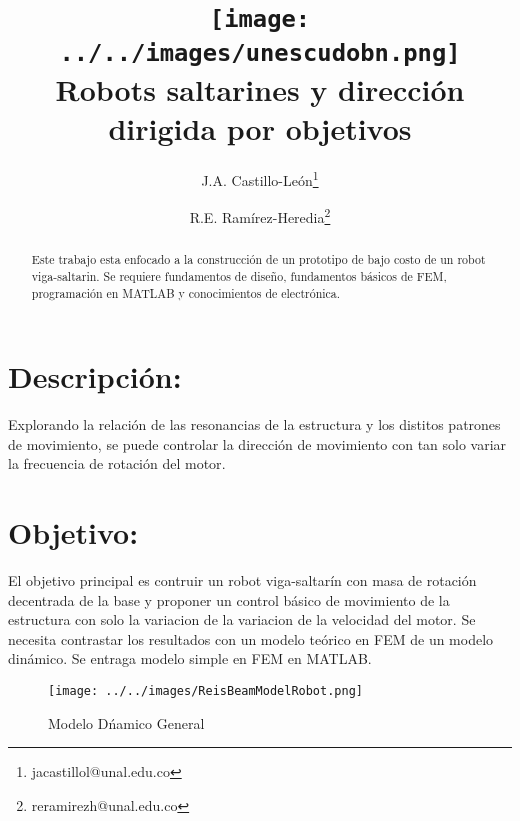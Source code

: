 \documentclass[10pt,onecolumn,twoside,letterpaper]{article}
\title{\vspace{-0.8cm}\texttt{[image: ../../images/unescudobn.png]}\\\vspace{-0.0cm}
  \LARGE \textbf{Robots saltarines y direcci\'on dirigida por objetivos}}
\author{J.A. Castillo-Le\'on\thanks{jacastillol@unal.edu.co} \and R.E. Ram\'irez-Heredia\thanks{reramirezh@unal.edu.co}}
\date{}
\begin{document}
\maketitle
\begin{abstract}\small
  Este trabajo esta enfocado a la construcci\'on de un prototipo de bajo costo de un robot viga-saltarin. Se requiere fundamentos de dise\~no, fundamentos b\'asicos de FEM, programaci\'on en MATLAB y conocimientos de electr\'onica.
\end{abstract}
\section{Descripci\'on:}
Explorando la relaci\'on de las resonancias de la estructura y los distitos patrones de movimiento, se puede controlar la direcci\'on de movimiento con tan solo variar la frecuencia de rotaci\'on del motor\cite{Reis2014}.
\section{Objetivo:}
El objetivo principal es contruir un robot viga-saltar\'in con masa de rotaci\'on decentrada de la base y proponer un control b\'asico de movimiento de la estructura con solo la variacion de la variacion de la velocidad del motor. Se necesita contrastar los resultados con un modelo te\'orico en FEM de un modelo din\'amico. Se entraga modelo simple en FEM en MATLAB.
\begin{figure}[!ht]
  \centering
  \texttt{[image: ../../images/ReisBeamModelRobot.png]}
  \caption{Modelo D\'namico General}
  \label{fig:grizmodelo}
\end{figure}

\end{document}
